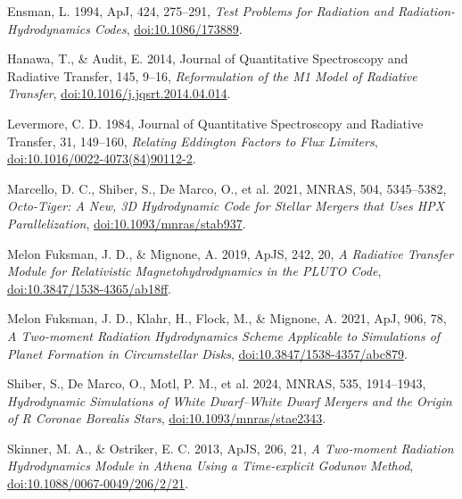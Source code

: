 \documentclass[manuscript]{aastex7}
\begin{document}
\begin{thebibliography}{}
Ensman, L. 1994, ApJ, 424, 275--291,
\emph{Test Problems for Radiation and Radiation-Hydrodynamics Codes},
\href{https://doi.org/10.1086/173889}{doi:10.1086/173889}.

Hanawa, T., \& Audit, E. 2014, Journal of Quantitative Spectroscopy and
Radiative Transfer, 145, 9--16,
\emph{Reformulation of the M1 Model of Radiative Transfer},
\href{https://doi.org/10.1016/j.jqsrt.2014.04.014}{doi:10.1016/j.jqsrt.2014.04.014}.

Levermore, C. D. 1984, Journal of Quantitative Spectroscopy and Radiative
Transfer, 31, 149--160,
\emph{Relating Eddington Factors to Flux Limiters},
\href{https://doi.org/10.1016/0022-4073(84)90112-2}{doi:10.1016/0022-4073(84)90112-2}.

Marcello, D. C., Shiber, S., De Marco, O., et al. 2021, MNRAS, 504,
5345--5382,
\emph{Octo-Tiger: A New, 3D Hydrodynamic Code for Stellar Mergers that Uses
HPX Parallelization},
\href{https://doi.org/10.1093/mnras/stab937}{doi:10.1093/mnras/stab937}.

Melon Fuksman, J. D., \& Mignone, A. 2019, ApJS, 242, 20,
\emph{A Radiative Transfer Module for Relativistic Magnetohydrodynamics
in the PLUTO Code},
\href{https://doi.org/10.3847/1538-4365/ab18ff}{doi:10.3847/1538-4365/ab18ff}.

Melon Fuksman, J. D., Klahr, H., Flock, M., \& Mignone, A. 2021,
ApJ, 906, 78,
\emph{A Two-moment Radiation Hydrodynamics Scheme Applicable to
Simulations of Planet Formation in Circumstellar Disks},
\href{https://doi.org/10.3847/1538-4357/abc879}{doi:10.3847/1538-4357/abc879}.

Shiber, S., De Marco, O., Motl, P. M., et al. 2024, MNRAS, 535,
1914--1943,
\emph{Hydrodynamic Simulations of White Dwarf--White Dwarf Mergers and
the Origin of R Coronae Borealis Stars},
\href{https://doi.org/10.1093/mnras/stae2343}{doi:10.1093/mnras/stae2343}.

Skinner, M. A., \& Ostriker, E. C. 2013, ApJS, 206, 21,
\emph{A Two-moment Radiation Hydrodynamics Module in Athena Using a
Time-explicit Godunov Method},
\href{https://doi.org/10.1088/0067-0049/206/2/21}{doi:10.1088/0067-0049/206/2/21}.
\end{thebibliography}
\end{document}
